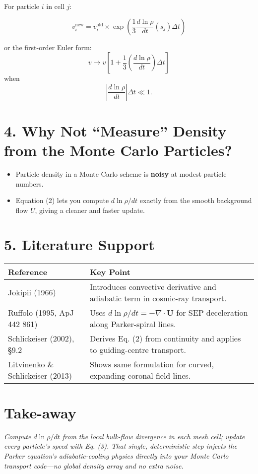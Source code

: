 For particle $i$ in cell $j$:

\begin{equation}
\boxed{\displaystyle
v_i^{\text{new}} =
v_i^{\text{old}} \times \exp\left( \frac{1}{3} \frac{d\ln\rho}{dt}(s_j) \Delta t \right)
}
\tag{3}
\end{equation}

or the first-order Euler form:
\[
v \to v \left[ 1 + \frac{1}{3} \left( \frac{d\ln\rho}{dt} \right) \Delta t \right]
\]
when
\[
\left| \frac{d\ln\rho}{dt} \right| \Delta t \ll 1.
\]

\hrulefill

\section*{4. Why Not ``Measure'' Density from the Monte Carlo Particles?}

\begin{itemize}
    \item Particle density in a Monte Carlo scheme is \textbf{noisy} at modest particle numbers.
    \item Equation (2) lets you compute $d\ln\rho/dt$ exactly from the smooth background flow $U$, giving a cleaner and faster update.
\end{itemize}

\hrulefill

\section*{5. Literature Support}

\begin{center}
\begin{tabular}{@{}ll@{}}
\toprule
\textbf{Reference} & \textbf{Key Point} \\
\midrule
Jokipii (1966) & Introduces convective derivative and adiabatic term in cosmic-ray transport. \\
Ruffolo (1995, ApJ 442 861) & Uses $d\ln\rho/dt = -\nabla \cdot \mathbf{U}$ for SEP deceleration along Parker-spiral lines. \\
Schlickeiser (2002), \S9.2 & Derives Eq. (2) from continuity and applies to guiding-centre transport. \\
Litvinenko \& Schlickeiser (2013) & Shows same formulation for curved, expanding coronal field lines. \\
\bottomrule
\end{tabular}
\end{center}

\hrulefill

\section*{Take-away}

\textit{Compute $d\ln\rho/dt$ from the local bulk-flow divergence in each mesh cell; update every particle’s speed with Eq. (3). That single, deterministic step injects the Parker equation’s adiabatic-cooling physics directly into your Monte Carlo transport code—no global density array and no extra noise.}
